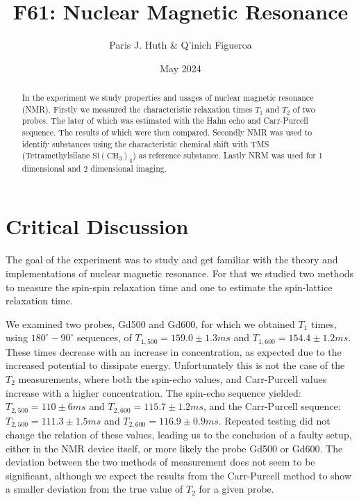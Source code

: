 \documentclass[11 pt]{article}
\title{F61: Nuclear Magnetic Resonance}
\author{Paris J. Huth \& Q'inich Figueroa}
\date{May 2024}
\begin{document}
\maketitle
\begin{center}
\begin{abstract}
In the experiment we study properties and usages of nuclear magnetic resonance (NMR). Firstly we measured the characteristic relaxation times $T_1$ and $T_2$ of two probes. The later of which was estimated with the Hahn echo and Carr-Purcell sequence. The results of which were then compared. Secondly NMR was used to identify substances using  the characteristic chemical shift with TMS (Tetramethylsilane $\mathrm{Si}\left(\mathrm{CH_3}\right)_4$) as reference substance. Lastly NRM was used for 1 dimensional and 2 dimensional imaging.  
\end{abstract}
\end{center}




\newpage
\section{Critical Discussion}
The goal of the experiment was to study and get familiar with the theory and implementations of nuclear magnetic resonance. For that we studied two methods to measure the spin-spin relaxation time and one to estimate the spin-lattice relaxation time.

We examined two probes, Gd500 and Gd600, for which we obtained $T_1$ times, using $180^\circ - 90^\circ$ sequences, of $T_{1,500}=159.0\pm 1.3 ms$ and $T_{1,600}=154.4\pm 1.2 ms$. These times decrease with an increase in concentration, as expected due to the increased potential to dissipate energy.
Unfortunately this is not the case of the $T_2$ measurements, where both the spin-echo values, and Carr-Purcell values increase with a higher concentration. The spin-echo sequence yielded: $T_{2,500}=110\pm 6 ms$ and $T_{2,600}=115.7\pm 1.2 ms$, and the Carr-Purcell sequence: $T_{2,500}=111.3\pm 1.5 ms$ and $T_{2,600}=116.9\pm 0.9 ms$. Repeated testing did not change the relation of these values, leading us to the conclusion of a faulty setup, either in the NMR device itself, or more likely the probe Gd500 or Gd600. 
The deviation between the two methods of measurement does not seem to be significant, although we expect the results from the Carr-Purcell method to show a smaller deviation from the true value of $T_2$ for a given probe.
\end{document}
